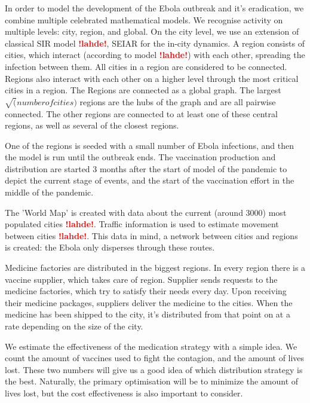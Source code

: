 \documentclass[12pt]{article}
\newcommand{\NB}[0]{\textcolor{red}{\textbf{!lahde!}}}
\newcommand{\TD}[0]{\textcolor{red}{\textbf{!TODO!}}}
\begin{document}
In order to model the development of the Ebola outbreak and it's eradication, we combine multiple celebrated mathematical models. We recognise activity on multiple levels: city, region, and global. On the city level, we use an extension of classical SIR model \NB , SEIAR for the in-city dynamics. A region consists of cities, which interact (according to model \NB) with each other, spreading the infection between them. All cities in a region are considered to be connected. Regions also interact with each other on a higher level through the most critical cities in a region. The Regions are connected as a global graph. The largest $\sqrt(number of cities)$ regions are the hubs of the graph and are all pairwise connected. The other regions are connected to at least one of these central regions, as well as several of the closest regions.

One of the regions is seeded with a small number of Ebola infections, and then the model is run until the outbreak ends. The vaccination production and distribution are started 3 months after the start of model of the pandemic to depict the current stage of events, and the start of the vaccination effort in the middle of the pandemic. 

The 'World Map' is created with data about the current (around 3000) most populated cities \NB. Traffic information is used to estimate movement between cities \NB. This data in mind, a network between cities and regions is created: the Ebola only disperses through these routes.

Medicine factories are distributed in the biggest regions. In every region there is a vaccine supplier, which takes care of region. Supplier sends requests to the medicine factories, which try to satisfy their needs every day. Upon receiving their medicine packages, suppliers deliver the medicine to the cities. When the medicine has been shipped to the city, it's distributed from that point on at a rate depending on the size of the city.

We estimate the effectiveness of the medication strategy with a simple idea. We count the amount of vaccines used to fight the contagion, and the amount of lives lost. These two numbers will give us a good idea of which distribution strategy is the best. Naturally, the primary optimisation will be to minimize the amount of lives lost, but the cost effectiveness is also important to consider.



\end{document}
